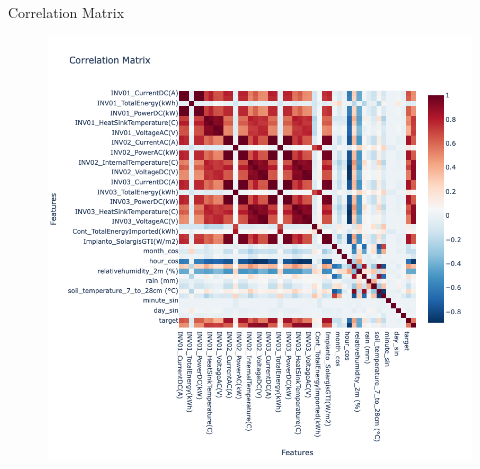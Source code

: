 \begin{frame}{Correlation Matrix}
    \begin{figure}
        \centering
        \includegraphics[width=.7\textwidth]{sections/2_preprocessing/imgs/correlationmatrix.png}
    \end{figure}
\end{frame}
